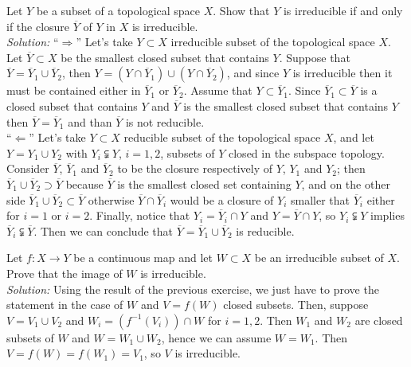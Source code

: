 \documentclass[../main/main.tex]{subfiles}
\begin{document}
\begin{ex} Let $Y$ be a subset of a topological space $X$. Show that $Y$ is irreducible if and only if the closure $\overline Y$ of $Y$ in $X$ is irreducible. \\
%
\textit{Solution:}
%
``$\Rightarrow$'' Let's take $Y\subset X$ irreducible subset of the topological space $X$. Let $\overline Y\subset X$ be the smallest closed subset that contains $Y$. Suppose that $\overline Y=\overline Y_1\cup \overline Y_2$, then $Y=(Y\cap \overline Y_1)\cup(Y\cap \overline Y_2)$, and since $Y$ is irreducible then it must be contained either in $\overline Y_1$ or $\overline Y_2$. Assume that $Y\subset \overline Y_1$. Since $\overline Y_1\subset \overline Y$ is a closed subset that contains $Y$ and $\overline Y$ is the smallest closed subset that contains $Y$ then $\overline Y=\overline Y_1$ and than $\overline Y$ is not reducible. \\
%
``$\Leftarrow$'' Let's take $Y\subset X$ reducible subset of the topological space $X$, and let $Y=Y_1\cup  Y_2$ with $Y_i\subsetneqq Y$, $i=1,2$,  subsets of $Y$  closed in the subspace topology. Consider $\overline Y$, $\overline Y_1$ and $\overline Y_2$ to be the closure respectively of $Y$, $Y_1$ and $Y_2$; then $\overline Y_1\cup\overline Y_2\supset \overline Y$ because $\overline Y$ is the smallest closed set containing $Y$, and on the other side $\overline Y_1\cup\overline Y_2\subset \overline Y$ otherwise $\overline Y\cap\overline Y_i$ would be a closure of $Y_i$ smaller that $\overline Y_i$ either for $i=1$ or $i=2$. Finally, notice that $Y_i=\overline Y_i\cap Y$ and  $Y=\overline Y\cap Y$, so $Y_i\subsetneqq Y$ implies $\overline Y_i\subsetneqq \overline Y$. Then we can conclude that  $\overline Y=\overline Y_1\cup\overline Y_2$ is reducible. 

\end{ex}

\begin{ex}
Let $f:X\to Y$ be a continuous map and let $W\subset X$ be an irreducible subset of $X$. Prove that the image of $W$ is irreducible. \\
%
\textit{Solution:}
%
Using the result of the previous exercise, we just have to prove the statement in the case of $W$ and $V=f(W)$ closed subsets. Then, suppose $V=V_1\cup V_2$ and $W_i=(f^{-1}(V_i))\cap W$ for $i=1,2$. Then $W_1$ and $W_2$ are closed subsets of $W$ and $W=W_1\cup W_2$, hence we can assume $W=W_1$. Then $V=f(W)=f(W_1)=V_1$, so $V$ is irreducible.

\end{ex}
\end{document}
